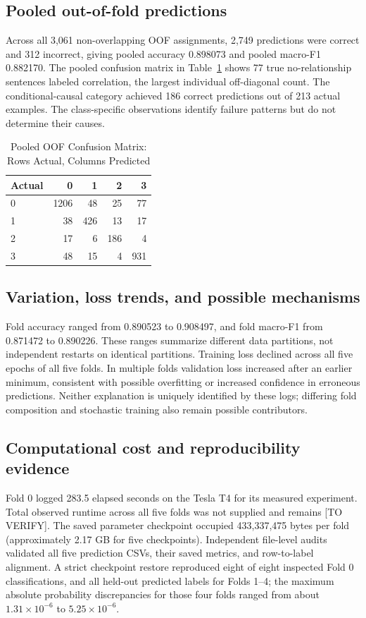 \documentclass[conference]{IEEEtran}
\begin{document}
\subsection{Pooled out-of-fold predictions}
Across all 3,061 non-overlapping OOF assignments, 2,749 predictions were correct and 312 incorrect, giving pooled accuracy 0.898073 and pooled macro-F1 0.882170. The pooled confusion matrix in Table~\ref{tab:confusion} shows 77 true no-relationship sentences labeled correlation, the largest individual off-diagonal count. The conditional-causal category achieved 186 correct predictions out of 213 actual examples. The class-specific observations identify failure patterns but do not determine their causes.

\begin{table}[t]
\centering
\caption{Pooled OOF Confusion Matrix: Rows Actual, Columns Predicted}\label{tab:confusion}
\begin{tabular}{@{}lrrrr@{}}
\toprule
Actual & 0 & 1 & 2 & 3\\
\midrule
0 & 1206 & 48 & 25 & 77\\
1 & 38 & 426 & 13 & 17\\
2 & 17 & 6 & 186 & 4\\
3 & 48 & 15 & 4 & 931\\
\bottomrule
\end{tabular}
\end{table}

\subsection{Variation, loss trends, and possible mechanisms}
Fold accuracy ranged from 0.890523 to 0.908497, and fold macro-F1 from 0.871472 to 0.890226. These ranges summarize different data partitions, not independent restarts on identical partitions. Training loss declined across all five epochs of all five folds. In multiple folds validation loss increased after an earlier minimum, consistent with possible overfitting or increased confidence in erroneous predictions. Neither explanation is uniquely identified by these logs; differing fold composition and stochastic training also remain possible contributors.

\subsection{Computational cost and reproducibility evidence}
Fold 0 logged 283.5 elapsed seconds on the Tesla T4 for its measured experiment. Total observed runtime across all five folds was not supplied and remains [TO VERIFY]. The saved parameter checkpoint occupied 433,337,475 bytes per fold (approximately 2.17 GB for five checkpoints). Independent file-level audits validated all five prediction CSVs, their saved metrics, and row-to-label alignment. A strict checkpoint restore reproduced eight of eight inspected Fold 0 classifications, and all held-out predicted labels for Folds 1--4; the maximum absolute probability discrepancies for those four folds ranged from about $1.31\times10^{-6}$ to $5.25\times10^{-6}$.
\end{document}
